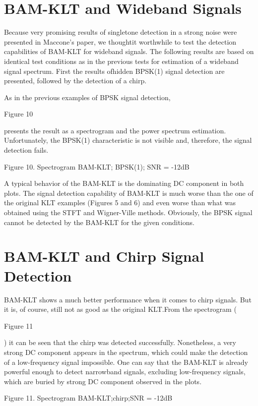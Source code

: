 \documentclass[12pt]{report}
\begin{document}
\section*{BAM-KLT and Wideband Signals}
Because very promising results of singletone detection in a strong noise were presented in Maccone's paper, we thoughtit worthwhile to test the detection capabilities of BAM-KLT for wideband signals. The following results are based on identical test conditions as in the previous tests for estimation of a wideband signal spectrum. First the results ofhidden BPSK(1) signal detection are presented, followed by the detection of a chirp.

As in the previous examples of BPSK signal detection, \begin{normalsize}\color{red}Figure 10\end{normalsize} presents the result as a spectrogram and the power spectrum estimation. Unfortunately, the BPSK(1) characteristic is not visible and, therefore, the signal detection fails.
\begin{center}
	\color{blue}Figure 10. Spectrogram BAM-KLT; BPSK(1); SNR = -12dB
\end{center}
A typical behavior of the BAM-KLT is the dominating DC component in both plots. The signal detection  capability of BAM-KLT is much worse than the one of the original KLT examples (Figures 5 and 6) and even worse than what was obtained using the STFT and Wigner-Ville methods. Obviously, the BPSK signal cannot be detected by the BAM-KLT for the given conditions.
\section*{BAM-KLT and Chirp Signal Detection}
BAM-KLT shows a much better performance when it comes to chirp signals.
But it is, of course, still not as good as the original KLT.\@ From the spectrogram (\begin{normalsize}\color{red}Figure 11\end{normalsize}) it can be seen that the chirp was detected successfully. Nonetheless, a very strong DC component appears in the spectrum, which could
make the detection of a low-frequency signal impossible. One can say that the BAM-KLT is already powerful enough to detect narrowband signals, excluding
low-frequency signals, which are buried by strong DC component observed in the plots.
\begin{center}
	\color{blue}Figure 11. Spectrogram BAM-KLT;\@ chirp;\@ SNR = -12dB
\end{center}
\end{document}
